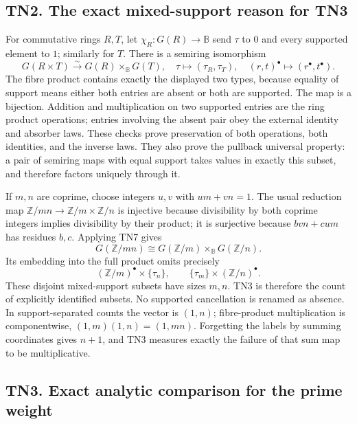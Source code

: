 \documentclass[
  10pt,
  a4paper,
]{article}
\begin{document}
\subsection{TN2. The exact mixed-support reason for
TN3}\label{tn2.-the-exact-mixed-support-reason-for-tn3}

For commutative rings \(R,T\), let \(\chi_R:G(R)\to\mathbb B\) send
\(\tau\) to \(0\) and every supported element to \(1\); similarly for
\(T\). There is a semiring isomorphism \[
G(R\times T)\xrightarrow{\sim}
G(R)\times_{\mathbb B}G(T),
\quad \tau\longmapsto(\tau_R,\tau_T),\quad
(r,t)^\bullet\longmapsto(r^\bullet,t^\bullet).
\tag{TN7}
\] The fibre product contains exactly the displayed two types, because
equality of support means either both entries are absent or both are
supported. The map is a bijection. Addition and multiplication on two
supported entries are the ring product operations; entries involving the
absent pair obey the external identity and absorber laws. These checks
prove preservation of both operations, both identities, and the inverse
laws. They also prove the pullback universal property: a pair of
semiring maps with equal support takes values in exactly this subset,
and therefore factors uniquely through it.

If \(m,n\) are coprime, choose integers \(u,v\) with \(um+vn=1\). The
usual reduction map \(\mathbb Z/mn\to\mathbb Z/m\times\mathbb Z/n\) is
injective because divisibility by both coprime integers implies
divisibility by their product; it is surjective because \(bvn+cum\) has
residues \(b,c\). Applying TN7 gives \[
G(\mathbb Z/mn)\cong
G(\mathbb Z/m)\times_{\mathbb B}G(\mathbb Z/n).
\tag{TN8}
\] Its embedding into the full product omits precisely \[
(\mathbb Z/m)^\bullet\times\{\tau_n\},\qquad
\{\tau_m\}\times(\mathbb Z/n)^\bullet.
\tag{TN9}
\] These disjoint mixed-support subsets have sizes \(m,n\). TN3 is
therefore the count of explicitly identified subsets. No supported
cancellation is renamed as absence. In support-separated counts the
vector is \((1,n)\); fibre-product multiplication is componentwise,
\((1,m)(1,n)=(1,mn)\). Forgetting the labels by summing coordinates
gives \(n+1\), and TN3 measures exactly the failure of that sum map to
be multiplicative.

\subsection{TN3. Exact analytic comparison for the prime
weight}\label{tn3.-exact-analytic-comparison-for-the-prime-weight}
\end{document}
